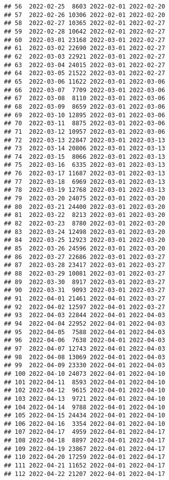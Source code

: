 \documentclass[
]{article}
\begin{document}
\begin{verbatim}
## 56  2022-02-25  8603 2022-02-01 2022-02-20
## 57  2022-02-26 10306 2022-02-01 2022-02-20
## 58  2022-02-27 10365 2022-02-01 2022-02-27
## 59  2022-02-28 10642 2022-02-01 2022-02-27
## 60  2022-03-01 23168 2022-03-01 2022-02-27
## 61  2022-03-02 22690 2022-03-01 2022-02-27
## 62  2022-03-03 22921 2022-03-01 2022-02-27
## 63  2022-03-04 24015 2022-03-01 2022-02-27
## 64  2022-03-05 21522 2022-03-01 2022-02-27
## 65  2022-03-06 11622 2022-03-01 2022-03-06
## 66  2022-03-07  7709 2022-03-01 2022-03-06
## 67  2022-03-08  8110 2022-03-01 2022-03-06
## 68  2022-03-09  8659 2022-03-01 2022-03-06
## 69  2022-03-10 12895 2022-03-01 2022-03-06
## 70  2022-03-11  8875 2022-03-01 2022-03-06
## 71  2022-03-12 10957 2022-03-01 2022-03-06
## 72  2022-03-13 22847 2022-03-01 2022-03-13
## 73  2022-03-14 20806 2022-03-01 2022-03-13
## 74  2022-03-15  8066 2022-03-01 2022-03-13
## 75  2022-03-16  6335 2022-03-01 2022-03-13
## 76  2022-03-17 11687 2022-03-01 2022-03-13
## 77  2022-03-18  6969 2022-03-01 2022-03-13
## 78  2022-03-19 12768 2022-03-01 2022-03-13
## 79  2022-03-20 24075 2022-03-01 2022-03-20
## 80  2022-03-21 24400 2022-03-01 2022-03-20
## 81  2022-03-22  8213 2022-03-01 2022-03-20
## 82  2022-03-23  8780 2022-03-01 2022-03-20
## 83  2022-03-24 12498 2022-03-01 2022-03-20
## 84  2022-03-25 12923 2022-03-01 2022-03-20
## 85  2022-03-26 24596 2022-03-01 2022-03-20
## 86  2022-03-27 22686 2022-03-01 2022-03-27
## 87  2022-03-28 23417 2022-03-01 2022-03-27
## 88  2022-03-29 10081 2022-03-01 2022-03-27
## 89  2022-03-30  8917 2022-03-01 2022-03-27
## 90  2022-03-31  9093 2022-03-01 2022-03-27
## 91  2022-04-01 21461 2022-04-01 2022-03-27
## 92  2022-04-02 12597 2022-04-01 2022-03-27
## 93  2022-04-03 22844 2022-04-01 2022-04-03
## 94  2022-04-04 22952 2022-04-01 2022-04-03
## 95  2022-04-05  7588 2022-04-01 2022-04-03
## 96  2022-04-06  7638 2022-04-01 2022-04-03
## 97  2022-04-07 12743 2022-04-01 2022-04-03
## 98  2022-04-08 13069 2022-04-01 2022-04-03
## 99  2022-04-09 23330 2022-04-01 2022-04-03
## 100 2022-04-10 24073 2022-04-01 2022-04-10
## 101 2022-04-11  8593 2022-04-01 2022-04-10
## 102 2022-04-12  9615 2022-04-01 2022-04-10
## 103 2022-04-13  9721 2022-04-01 2022-04-10
## 104 2022-04-14  9788 2022-04-01 2022-04-10
## 105 2022-04-15 24434 2022-04-01 2022-04-10
## 106 2022-04-16  3354 2022-04-01 2022-04-10
## 107 2022-04-17  4959 2022-04-01 2022-04-17
## 108 2022-04-18  8897 2022-04-01 2022-04-17
## 109 2022-04-19 23867 2022-04-01 2022-04-17
## 110 2022-04-20 17259 2022-04-01 2022-04-17
## 111 2022-04-21 11652 2022-04-01 2022-04-17
## 112 2022-04-22 21207 2022-04-01 2022-04-17

\end{verbatim}
\end{document}
